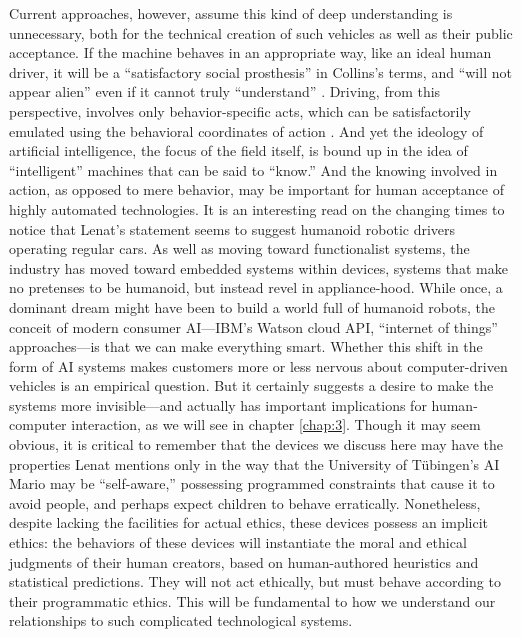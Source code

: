 Current approaches, however, assume this kind of deep understanding is
unnecessary, both for the technical creation of such vehicles as well
as their public acceptance. If the machine behaves in an appropriate
way, like an ideal human driver, it will be a ``satisfactory social
prosthesis'' in Collins's terms, and ``will not appear alien'' even if
it cannot truly ``understand'' \cite[p. 31]{Collins}. Driving, from
this perspective, involves only behavior-specific acts, which can be
satisfactorily emulated using the behavioral coordinates of
action \cite[p. 33--37]{Collins}. And yet the ideology of artificial
intelligence, the focus of the field itself, is bound up in the idea
of ``intelligent'' machines that can be said to ``know.'' And the
knowing involved in action, as opposed to mere behavior, may be
important for human acceptance of highly automated technologies. It is an
interesting read on the changing 
times to notice that Lenat's statement seems to suggest humanoid
robotic drivers operating regular cars. As well as moving toward
functionalist systems, the industry has moved toward embedded systems
within devices, systems that make no pretenses to be humanoid, but
instead revel in appliance-hood. While once, a dominant dream might have been
to build a world full of humanoid robots, the conceit of modern
consumer AI---IBM's Watson cloud API, ``internet of things''
approaches---is that we can make everything smart. Whether this shift in the form of AI
systems makes customers more or less nervous about computer-driven
vehicles is an empirical question. But it certainly suggests a desire
to make the systems more 
invisible---and actually has important implications for human-computer
interaction, as we will see in chapter \ref{chap:3}. Though it may seem
obvious, it is critical to remember that the devices we discuss here may
have the properties Lenat mentions only in the way that the University
of T\"{u}bingen's AI Mario may be
``self-aware,'' possessing programmed constraints that cause it to
avoid people, and perhaps expect children to behave erratically.
Nonetheless, despite lacking the facilities for actual ethics, these
devices possess an implicit ethics: the
behaviors of these devices will instantiate the moral and
ethical judgments of their human creators, based on
human-authored heuristics and statistical predictions. They will not
act ethically, but must
behave according to their programmatic ethics. This will be
fundamental to how we understand our relationships to such
complicated technological systems.

